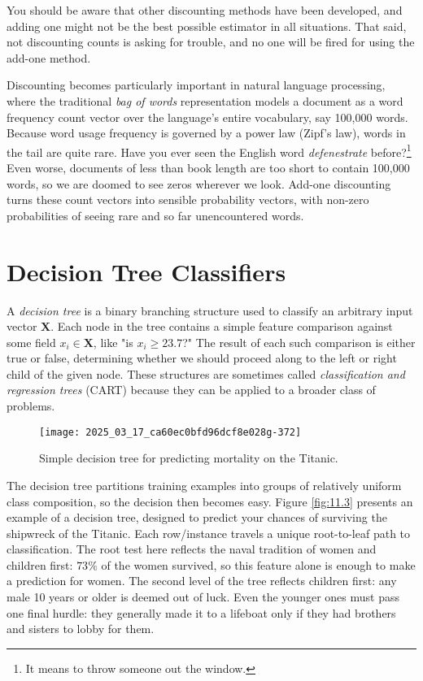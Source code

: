 \documentclass[10pt]{article}
\begin{document}
\begin{enumerate}
You should be aware that other discounting methods have been developed, and adding one might not be the best possible estimator in all situations. That said, not discounting counts is asking for trouble, and no one will be fired for using the add-one method.

Discounting becomes particularly important in natural language processing, where the traditional \textit{bag of words} representation models a document as a word frequency count vector over the language's entire vocabulary, say 100,000 words. Because word usage frequency is governed by a power law (Zipf's law), words in the tail are quite rare. Have you ever seen the English word \textit{defenestrate} before?\footnote{It means to throw someone out the window.} Even worse, documents of less than book length are too short to contain 100,000 words, so we are doomed to see zeros wherever we look. Add-one discounting turns these count vectors into sensible probability vectors, with non-zero probabilities of seeing rare and so far unencountered words.

\section*{Decision Tree Classifiers}
A \textit{decision tree} is a binary branching structure used to classify an arbitrary input vector $\mathbf{X}$. Each node in the tree contains a simple feature comparison against some field $x_i \in \mathbf{X}$, like "is $x_i \geq 23.7$?" The result of each such comparison is either true or false, determining whether we should proceed along to the left or right child of the given node. These structures are sometimes called \textit{classification and regression trees} (CART) because they can be applied to a broader class of problems.

\begin{figure}[h!]
\centering
\texttt{[image: 2025\_03\_17\_ca60ec0bfd96dcf8e028g-372]}
\caption{Simple decision tree for predicting mortality on the Titanic.}
\end{figure}

The decision tree partitions training examples into groups of relatively uniform class composition, so the decision then becomes easy. Figure \ref{fig:11.3} presents an example of a decision tree, designed to predict your chances of surviving the shipwreck of the Titanic. Each row/instance travels a unique root-to-leaf path to classification. The root test here reflects the naval tradition of women and children first: $73\%$ of the women survived, so this feature alone is enough to make a prediction for women. The second level of the tree reflects children first: any male 10 years or older is deemed out of luck. Even the younger ones must pass one final hurdle: they generally made it to a lifeboat only if they had brothers and sisters to lobby for them.


\end{enumerate}
\end{document}
